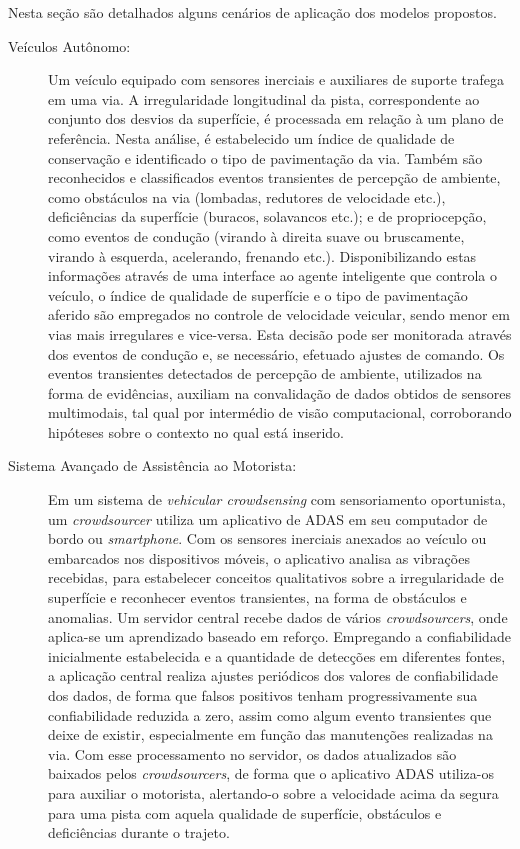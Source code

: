 Nesta seção são detalhados alguns cenários de aplicação dos modelos propostos.

\begin{description}

\item [Veículos Autônomo:] Um veículo equipado com sensores inerciais e auxiliares de suporte trafega em uma via. A irregularidade longitudinal da pista, correspondente ao conjunto dos desvios da superfície, é processada em relação à um plano de referência. Nesta análise, é estabelecido um índice de qualidade de conservação e identificado o tipo de pavimentação da via. Também são reconhecidos e classificados eventos transientes de percepção de ambiente, como obstáculos na via (lombadas, redutores de velocidade etc.), deficiências da superfície (buracos, solavancos etc.); e de propriocepção, como eventos de condução (virando à direita suave ou bruscamente, virando à esquerda, acelerando, frenando etc.). Disponibilizando estas informações através de uma interface ao agente inteligente que controla o veículo, o índice de qualidade de superfície e o tipo de pavimentação aferido são empregados no controle de velocidade veicular, sendo menor em vias mais irregulares e vice-versa. Esta decisão pode ser monitorada através dos eventos de condução e, se necessário, efetuado ajustes de comando. Os eventos transientes detectados de percepção de ambiente, utilizados na forma de evidências, auxiliam na convalidação de dados obtidos de sensores multimodais, tal qual por intermédio de visão computacional, corroborando hipóteses sobre o contexto no qual está inserido.

\item [Sistema Avançado de Assistência ao Motorista:] Em um sistema de \textit{vehicular crowdsensing} com sensoriamento oportunista, um \textit{crowdsourcer} utiliza um aplicativo de ADAS em seu computador de bordo ou \textit{smartphone}. Com os sensores inerciais anexados ao veículo ou embarcados nos dispositivos móveis, o aplicativo analisa as vibrações recebidas, para estabelecer conceitos qualitativos sobre a irregularidade de superfície e reconhecer eventos transientes, na forma de obstáculos e anomalias. Um servidor central recebe dados de vários \textit{crowdsourcers}, onde aplica-se um aprendizado baseado em reforço. Empregando a confiabilidade inicialmente estabelecida e a quantidade de detecções em diferentes fontes, a aplicação central realiza ajustes periódicos dos valores de confiabilidade dos dados, de forma que falsos positivos tenham progressivamente sua confiabilidade reduzida a zero, assim como algum evento transientes que deixe de existir, especialmente em função das manutenções realizadas na via. Com esse processamento no servidor, os dados atualizados são baixados pelos \textit{crowdsourcers}, de forma que o aplicativo ADAS utiliza-os para auxiliar o motorista, alertando-o sobre a velocidade acima da segura para uma pista com aquela qualidade de superfície, obstáculos e deficiências durante o trajeto.


\end{description}
